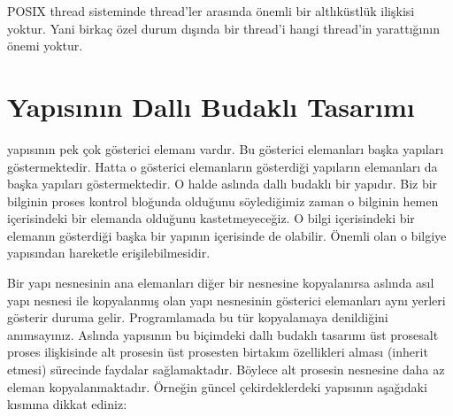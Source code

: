 \documentclass[a4paper,10pt,turkish]{sphinxmanual}
\begin{document}
\sphinxAtStartPar
POSIX thread sisteminde thread’ler arasında önemli bir altlık\sphinxhyphen{}üstlük ilişkisi yoktur. Yani birkaç özel
durum dışında bir thread’i hangi thread’in yarattığının önemi yoktur.


\section{ Yapısının Dallı Budaklı Tasarımı}
\label{\detokenize{processcontrolblock:task-struct-yapisinin-dalli-budakli-tasarimi}}
\sphinxAtStartPar
{} yapısının pek çok gösterici elemanı vardır. Bu gösterici elemanları başka yapıları
göstermektedir. Hatta o gösterici elemanların gösterdiği yapıların elemanları da başka yapıları
göstermektedir. O halde  aslında dallı budaklı bir yapıdır. Biz bir bilginin proses
kontrol bloğunda olduğunu söylediğimiz zaman o bilginin hemen  içerisindeki bir elemanda
olduğunu kastetmeyeceğiz. O bilgi  içerisindeki bir elemanın gösterdiği başka bir yapının
içerisinde de olabilir. Önemli olan o bilgiye  yapısından hareketle erişilebilmesidir.

\sphinxAtStartPar
Bir  yapı nesnesinin ana elemanları diğer bir  nesnesine kopyalanırsa
aslında asıl yapı nesnesi ile kopyalanmış olan yapı nesnesinin gösterici elemanları aynı yerleri gösterir
duruma gelir. Programlamada bu tür kopyalamaya  denildiğini anımsayınız.
Aslında  yapısının bu biçimdeki dallı budaklı tasarımı üst proses\sphinxhyphen{}alt proses ilişkisinde
alt prosesin üst prosesten birtakım özellikleri alması (inherit etmesi) sürecinde faydalar sağlamaktadır.
Böylece alt prosesin  nesnesine daha az eleman kopyalanmaktadır. Örneğin güncel
çekirdeklerdeki  yapısının aşağıdaki kısmına dikkat ediniz:

\begin{sphinxVerbatim}[commandchars=\\\{\}]



\end{sphinxVerbatim}
\end{document}
